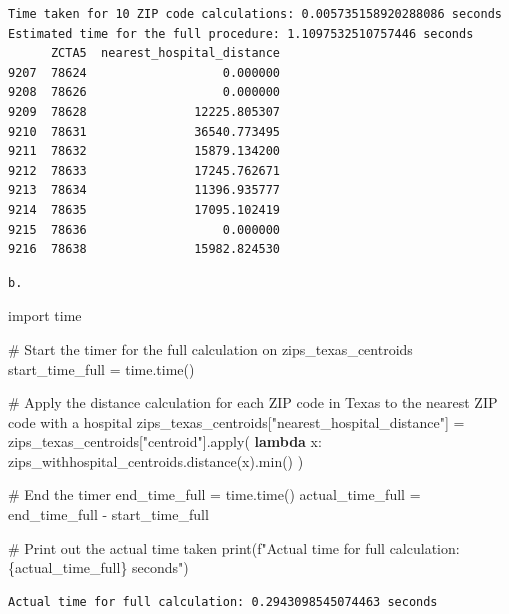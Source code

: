 \documentclass[
  letterpaper,
  DIV=11,
  numbers=noendperiod]{scrartcl}
\newenvironment{Shaded}{\begin{snugshade}}{\end{snugshade}}
\newcommand{\BuiltInTok}[1]{\textcolor[rgb]{0.00,0.23,0.31}{#1}}
\newcommand{\CommentTok}[1]{\textcolor[rgb]{0.37,0.37,0.37}{#1}}
\newcommand{\ImportTok}[1]{\textcolor[rgb]{0.00,0.46,0.62}{#1}}
\newcommand{\KeywordTok}[1]{\textcolor[rgb]{0.00,0.23,0.31}{\textbf{#1}}}
\newcommand{\NormalTok}[1]{\textcolor[rgb]{0.00,0.23,0.31}{#1}}
\newcommand{\OperatorTok}[1]{\textcolor[rgb]{0.37,0.37,0.37}{#1}}
\newcommand{\SpecialCharTok}[1]{\textcolor[rgb]{0.37,0.37,0.37}{#1}}
\newcommand{\SpecialStringTok}[1]{\textcolor[rgb]{0.13,0.47,0.30}{#1}}
\newcommand{\StringTok}[1]{\textcolor[rgb]{0.13,0.47,0.30}{#1}}
\begin{document}
\begin{verbatim}
Time taken for 10 ZIP code calculations: 0.005735158920288086 seconds
Estimated time for the full procedure: 1.1097532510757446 seconds
      ZCTA5  nearest_hospital_distance
9207  78624                   0.000000
9208  78626                   0.000000
9209  78628               12225.805307
9210  78631               36540.773495
9211  78632               15879.134200
9212  78633               17245.762671
9213  78634               11396.935777
9214  78635               17095.102419
9215  78636                   0.000000
9216  78638               15982.824530
\end{verbatim}

\begin{verbatim}
b.
\end{verbatim}

\begin{Shaded}
\begin{Highlighting}[]
\ImportTok{import}\NormalTok{ time}

\CommentTok{\# Start the timer for the full calculation on zips\_texas\_centroids}
\NormalTok{start\_time\_full }\OperatorTok{=}\NormalTok{ time.time()}

\CommentTok{\# Apply the distance calculation for each ZIP code in Texas to the nearest ZIP code with a hospital}
\NormalTok{zips\_texas\_centroids[}\StringTok{"nearest\_hospital\_distance"}\NormalTok{] }\OperatorTok{=}\NormalTok{ zips\_texas\_centroids[}\StringTok{"centroid"}\NormalTok{].}\BuiltInTok{apply}\NormalTok{(}
    \KeywordTok{lambda}\NormalTok{ x: zips\_withhospital\_centroids.distance(x).}\BuiltInTok{min}\NormalTok{()}
\NormalTok{)}

\CommentTok{\# End the timer}
\NormalTok{end\_time\_full }\OperatorTok{=}\NormalTok{ time.time()}
\NormalTok{actual\_time\_full }\OperatorTok{=}\NormalTok{ end\_time\_full }\OperatorTok{{-}}\NormalTok{ start\_time\_full}

\CommentTok{\# Print out the actual time taken}
\BuiltInTok{print}\NormalTok{(}\SpecialStringTok{f"Actual time for full calculation: }\SpecialCharTok{\{}\NormalTok{actual\_time\_full}\SpecialCharTok{\}}\SpecialStringTok{ seconds"}\NormalTok{)}
\end{Highlighting}
\end{Shaded}

\begin{verbatim}
Actual time for full calculation: 0.2943098545074463 seconds
\end{verbatim}
\end{document}
